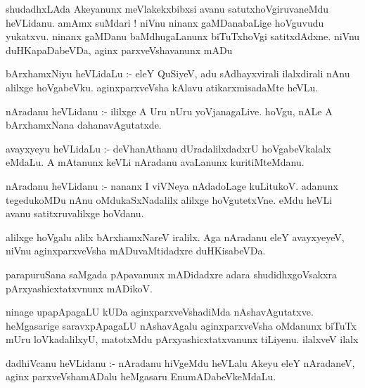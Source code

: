 \documentclass{article}
\begin{document}
\begin{mn}
shudadhxLAda  Akeyanunx  meVlakekxbibxsi  avanu  satutxhoVgiruvaneMdu  heVLidanu.  amAmx  suMdari !  niVnu  
ninanx  gaMDanabaLige  hoVguvudu  yukatxvu.  ninanx  gaMDanu  baMdhugaLanunx  biTuTxhoVgi  satitxdAdxne.  
niVnu  duHKapaDabeVDa,  aginx parxveVshavanunx  mADu
\end{mn}

\begin{mn}
bArxhamxNiyu  heVLidaLu :- eleY  QuSiyeV,  adu  sAdhayxvirali  ilalxdirali  nAnu  alilxge  hoVgabeVku.  
aginxparxveVsha  kAlavu  atikarxmisadaMte  heVLu.
\end{mn}

\begin{mn}
nAradanu  heVLidanu :- ililxge  A  Uru  nUru  yoVjanagaLive.  hoVgu,  nALe  A  bArxhamxNana  dahanavAgutatxde.
\end{mn}

\begin{mn}
avayxyeyu  heVLidaLu :- deVhanAthanu  dUradalilxdadxrU  hoVgabeVkalalx  eMdaLu.  A  mAtanunx  keVLi  
nAradanu  avaLanunx  kuritiMteMdanu.
\end{mn}

\begin{mn}
nAradanu  heVLidanu :- nananx  I  viVNeya  nAdadoLage  kuLitukoV.  adanunx  tegedukoMDu  nAnu  oMdukaSxNadalilx  
alilxge  hoVgutetxVne.  eMdu  heVLi  avanu  satitxruvalilxge  hoVdanu.
\end{mn}

\begin{mn}
alilxge  hoVgalu  alilx  bArxhamxNareV  iralilx.  Aga  nAradanu  eleY  avayxyeyeV,  niVnu  aginxparxveVsha  
mADuvaMtidadxre  duHKisabeVDa.
\end{mn}

\begin{mn}
parapuruSana  saMgada  pApavanunx  mADidadxre  adara  shudidhxgoVsakxra  pArxyashicxtatxvnunx  mADikoV.
\end{mn}

\begin{mn}
ninage  upapApagaLU  kUDa  aginxparxveVshadiMda  nAshavAgutatxve.  heMgasarige  saravxpApagaLU  nAshavAgalu  
aginxparxveVsha  oMdanunx  biTuTx  mUru  loVkadalilxyU,  matotxMdu  pArxyashicxtatxvanunx  tiLiyenu.  ilalxveV  ilalx
\end{mn}

\begin{mn}
dadhiVcanu  heVLidanu :- nAradanu  hiVgeMdu  heVLalu  Akeyu  eleY  nAradaneV,  aginx parxveVshamADalu  heMgasaru  EnumADabeVkeMdaLu.
\end{mn}
\end{document}
